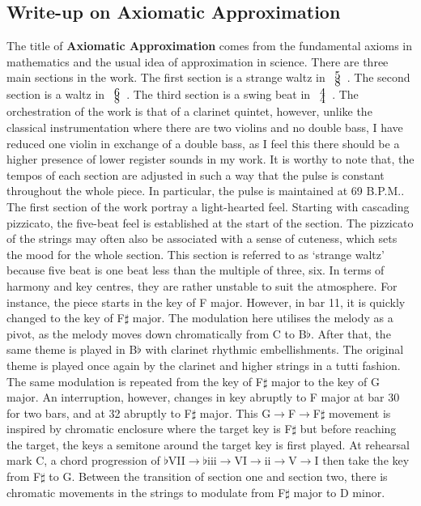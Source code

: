 \documentclass{article}
\begin{document}
\subsection{Write-up on {\bf Axiomatic Approximation}}

The title of \textbf{Axiomatic Approximation} comes from the fundamental axioms
in mathematics and the usual idea of approximation in science. There are three
main sections in the work. The first section is a strange waltz in
\(\def\arraystretch{0.0}\begin{array}{c}5\\8\end{array}\). The second section
    is a waltz in \(\def\arraystretch{0.0}\begin{array}{c}6\\8\end{array}\).
        The third section is a swing beat in
\(\def\arraystretch{0.0}\begin{array}{c}4\\4\end{array}\).  The orchestration
    of the work is that of a clarinet quintet, however, unlike the classical
instrumentation where there are two violins and no double bass, I have reduced
one violin in exchange of a double bass, as I feel this there should be a
higher presence of lower register sounds in my work. It is worthy to note that,
the tempos of each section are adjusted in such a way that the pulse is
constant throughout the whole piece. In particular, the pulse is maintained at
69 B.P.M..\\

The first section of the work portray a light-hearted feel. Starting with
cascading pizzicato, the five-beat feel is established at the start of the
section. The pizzicato of the strings may often also be associated with a sense
of cuteness, which sets the mood for the whole section. This section is
referred to as `strange waltz' because five beat is one beat less than the
multiple of three, six. In terms of harmony and key centres, they are rather
unstable to suit the atmosphere. For instance, the piece starts in the key of F
major. However, in bar 11, it is quickly changed to the key of F\(\sharp\)
major. The modulation here utilises the melody as a pivot, as the melody moves
down chromatically from C to B\(\flat\). After that, the same theme is played
in B\(\flat\) with clarinet rhythmic embellishments. The original theme is
played once again by the clarinet and higher strings in a tutti fashion. The
same modulation is repeated from the key of F\(\sharp\) major to the key of G
major. An interruption, however, changes in key abruptly to F major at bar 30
for two bars, and at 32 abruptly to F\(\sharp\) major. This
G\(\to\)F\(\to\)F\(\sharp\) movement is inspired by chromatic enclosure where
the target key is F\(\sharp\) but before reaching the target, the keys a
semitone around the target key is first played. At rehearsal mark C, a chord
progression of
\(\flat\)VII\(\to\)\(\flat\)iii\(\to\)VI\(\to\)ii\(\to\)V\(\to\)I then take the
key from F\(\sharp\) to G. Between the transition of section one and section
two, there is chromatic movements in the strings to modulate from F\(\sharp\)
major to D minor.\\
\end{document}
